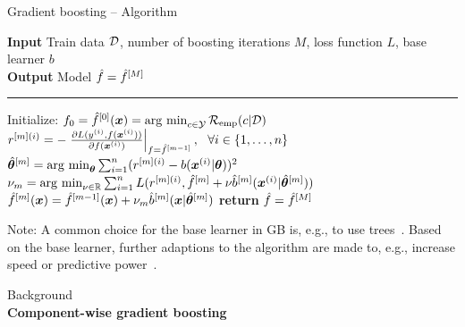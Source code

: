 \documentclass[t,10pt]{beamer}
\newcommand{\fSlide}[2]{
\begin{frame}[plain]{}%
  \vspace{4cm}%
  \Large #1\\[0.2cm]%
  {\LARGE\textbf{#2}}%
	\addtocounter{framenumber}{-1}%
\end{frame}%
}
\begin{document}
\begin{frame}{Gradient boosting -- Algorithm}

  \begin{algorithm}[H]
  \footnotesize
  \caption{GB algorithm}\label{algo:gb}
  \hspace*{\algorithmicindent} \textbf{Input} Train data $\mathcal{D}$, number of boosting iterations $M$, loss function $L$, base learner $b$\\
  \hspace*{\algorithmicindent} \textbf{Output} Model $\hat{f} = \hat{f}^{[M]}$\vspace{0.1cm}
  \hrule
  \begin{algorithmic}[1]
      \State Initialize: $f_0 = \hat{f}^{[0]}(\bm{x}) = \operatorname{arg~min}_{c\in\mathcal{Y}}\mathcal{R}_{\text{emp}}(c|\mathcal{D})$
          \State $r^{[m](i)} = -\left.\frac{\partial L(y^{(i)}, f(\bm{x}^{(i)}))}{\partial f(\bm{x}^{(i)})}\right|_{f = \hat{f}^{[m-1]}},\ \ \forall i \in \{1, \dots, n\}$
          \State $\hat{\bm{\theta}}^{[m]} = \operatorname{arg~min}_{\bm{\theta}} \sum_{i=1}^n(r^{[m](i)} - b(\bm{x}^{(i)} | \bm{\theta}))^2$
          \State $\nu_m = \operatorname{arg~min}_{\nu\in\mathbb{R}} \sum_{i=1}^n L(r^{[m](i)}, \hat{f}^{[m]} + \nu \hat{b}^{[m]}(\bm{x}^{(i)} | \hat{\bm{\theta}}^{[m]}))$
          \State $\hat{f}^{[m]}(\bm{x}) = \hat{f}^{[m-1]}(\bm{x}) + \nu_m \hat{b}^{[m]}(\bm{x} | \hat{\bm{\theta}}^{[m]})$
      \EndWhile
      \State \textbf{return} $\hat{f} = \hat{f}^{[M]}$
  \EndProcedure
  \end{algorithmic}
  \end{algorithm}
  \vspace{-0.5cm}
  Note: A common choice for the base learner in GB is, e.g., to use trees~\citep{friedman2001greedy}. Based on the base learner, further adaptions to the algorithm are made to, e.g., increase speed or predictive power~\citep{chen2015xgboost}.
\end{frame}

\fSlide{Background}{Component-wise gradient boosting}
\end{document}
